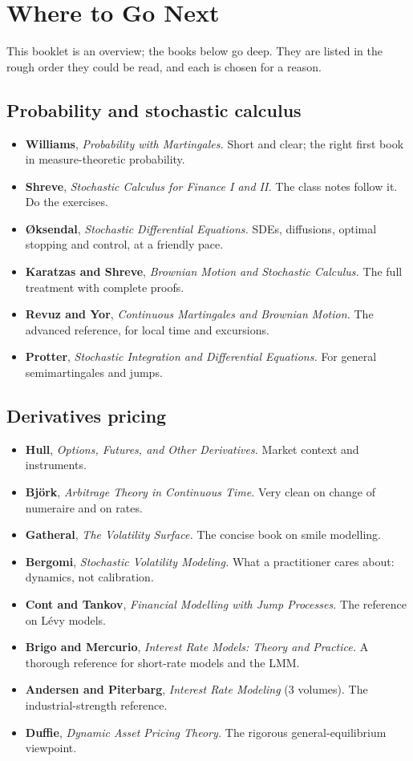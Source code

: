 \chapter{Where to Go Next}

This booklet is an overview; the books below go deep. They are listed in the rough order they could be read, and each is chosen for a reason.

\section*{Probability and stochastic calculus}
\begin{itemize}
\item \textbf{Williams}, \emph{Probability with Martingales.} Short and clear; the right first book in measure-theoretic probability.
\item \textbf{Shreve}, \emph{Stochastic Calculus for Finance I and II.} The class notes follow it. Do the exercises.
\item \textbf{\O ksendal}, \emph{Stochastic Differential Equations.} SDEs, diffusions, optimal stopping and control, at a friendly pace.
\item \textbf{Karatzas and Shreve}, \emph{Brownian Motion and Stochastic Calculus.} The full treatment with complete proofs.
\item \textbf{Revuz and Yor}, \emph{Continuous Martingales and Brownian Motion.} The advanced reference, for local time and excursions.
\item \textbf{Protter}, \emph{Stochastic Integration and Differential Equations.} For general semimartingales and jumps.
\end{itemize}

\section*{Derivatives pricing}
\begin{itemize}
\item \textbf{Hull}, \emph{Options, Futures, and Other Derivatives.} Market context and instruments.
\item \textbf{Bj\"ork}, \emph{Arbitrage Theory in Continuous Time.} Very clean on change of numeraire and on rates.
\item \textbf{Gatheral}, \emph{The Volatility Surface.} The concise book on smile modelling.
\item \textbf{Bergomi}, \emph{Stochastic Volatility Modeling.} What a practitioner cares about: dynamics, not calibration.
\item \textbf{Cont and Tankov}, \emph{Financial Modelling with Jump Processes.} The reference on L\'evy models.
\item \textbf{Brigo and Mercurio}, \emph{Interest Rate Models: Theory and Practice.} A thorough reference for short-rate models and the LMM.
\item \textbf{Andersen and Piterbarg}, \emph{Interest Rate Modeling} (3 volumes). The industrial-strength reference.
\item \textbf{Duffie}, \emph{Dynamic Asset Pricing Theory.} The rigorous general-equilibrium viewpoint.
\end{itemize}

